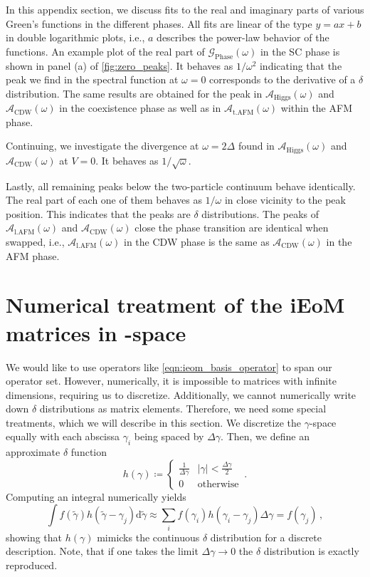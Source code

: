 \documentclass[
    reprint, 
    aps,
    preprintnumbers,
    twocolumn,
    prb,
    superscriptaddress
]{revtex4-2}
\newcommand{\greens}[1]{\mathcal{G}_\text{#1} (\omega)}
\newcommand{\spectral}[1]{\mathcal{A}_\text{#1}  (\omega)}
\def\hmath$#1${\texorpdfstring{{\rmfamily\textit{#1}}}{#1}}
\begin{document}
In this appendix section, we discuss fits to the real and imaginary parts of various Green's functions in the different phases.
All fits are linear of the type $y = ax + b$ in double logarithmic plots, i.e., $a$ describes the power-law behavior of the functions.
An example plot of the real part of $\greens{Phase}$ in the SC phase is shown in panel (a) of \autoref{fig:zero_peaks}.
It behaves as $1/\omega^2$ indicating that the peak we find in the spectral function at $\omega=0$ corresponds to the derivative of a $\delta$ distribution.
The same results are obtained for the peak in $\spectral{Higgs}$ and $\spectral{CDW}$ in the coexistence phase as well as in $\spectral{t.AFM}$ within the AFM phase.

Continuing, we investigate the divergence at $\omega = 2\Delta$ found in $\spectral{Higgs}$ and $\spectral{CDW}$ at $V=0$. It behaves as $1/\sqrt{\omega}$.

Lastly, all remaining peaks below the two-particle continuum behave identically.
The real part of each one of them behaves as $1/\omega$ in close vicinity to the peak position.
This indicates that the peaks are $\delta$ distributions.
The peaks of $\spectral{l.AFM}$ and $\spectral{CDW}$ close the phase transition are identical when swapped, 
i.e., $\spectral{l.AFM}$ in the CDW phase is the same as $\spectral{CDW}$ in the AFM phase.

\section{Numerical treatment of the iEoM matrices in \hmath $\gamma$-space}
\label{sec:numerical_ieom}

We would like to use operators like \eqref{eqn:ieom_basis_operator} to span our operator set.
However, numerically, it is impossible to matrices with infinite dimensions, requiring us to discretize.
Additionally, we cannot numerically write down $\delta$ distributions as matrix elements. Therefore, we need some special treatments, which we will describe in this section.
We discretize the $\gamma$-space equally with each abscissa $\gamma_i$ being spaced by $\Delta \gamma$.
Then, we define an approximate $\delta$ function
\begin{equation}
    h(\gamma) \coloneqq \begin{cases}
        \frac{1}{\Delta \gamma} & |\gamma| < \frac{\Delta \gamma}{2} \\ 0 & \text{otherwise}
    \end{cases}\,.
\end{equation}
Computing an integral numerically yields
\begin{equation}
    \int f(\tilde{\gamma}) h(\tilde{\gamma} - \gamma_j) \mathrm{d} \tilde{\gamma} \approx \sum_i f(\gamma_i) h(\gamma_i - \gamma_j) \Delta \gamma = f(\gamma_j)\,,
\end{equation}
showing that $h(\gamma)$ mimicks the continuous $\delta$ distribution for a discrete description.
Note, that if one takes the limit $\Delta \gamma \to 0$ the $\delta$ distribution is exactly reproduced.
\end{document}
